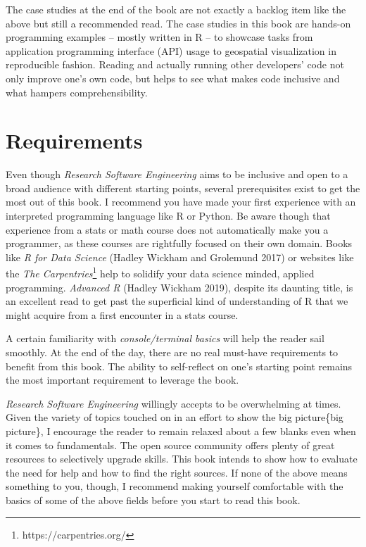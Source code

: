 \documentclass[
  12pt,
  letterpaper,
]{krantz}
\begin{document}
The case studies at the end of the book are not exactly a backlog item
like the above but still a recommended read. The case studies in this
book are hands-on programming examples -- mostly written in R -- to
showcase tasks from application programming interface (API) usage to
geospatial visualization in reproducible fashion. Reading and actually
running other developers' code not only improve one's own code, but
helps to see what makes code inclusive and what hampers
comprehensibility.

\hypertarget{requirements}{%
\section{Requirements}\label{requirements}}

Even though \emph{Research Software Engineering} aims to be inclusive
and open to a broad audience with different starting points, several
prerequisites exist to get the most out of this book. I recommend you
have made your first experience with an interpreted programming language
like R or Python. Be aware though that experience from a stats or math
course does not automatically make you a programmer, as these courses
are rightfully focused on their own domain. Books like \emph{R for Data
Science} (Hadley Wickham and Grolemund 2017) or websites like the
\emph{The Carpentries}\footnote{https://carpentries.org/} help to
solidify your data science minded, applied programming. \emph{Advanced
R} (Hadley Wickham 2019), despite its daunting title, is an excellent
read to get past the superficial kind of understanding of R that we
might acquire from a first encounter in a stats course.

A certain familiarity with \emph{console/terminal basics} will help the
reader sail smoothly. At the end of the day, there are no real must-have
requirements to benefit from this book. The ability to self-reflect on
one's starting point remains the most important requirement to leverage
the book.

\emph{Research Software Engineering} willingly accepts to be
overwhelming at times. Given the variety of topics touched on in an
effort to show the big picture\{big picture\}, I encourage the reader to
remain relaxed about a few blanks even when it comes to fundamentals.
The open source community offers plenty of great resources to
selectively upgrade skills. This book intends to show how to evaluate
the need for help and how to find the right sources. If none of the
above means something to you, though, I recommend making yourself
comfortable with the basics of some of the above fields before you start
to read this book.
\end{document}
